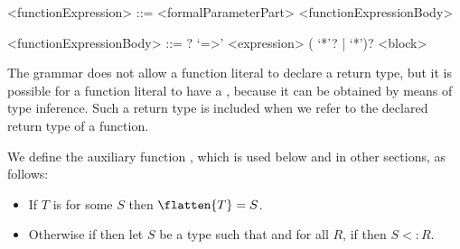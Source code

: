 \documentclass[makeidx]{article}
\begin{document}
{%
\begin{grammar}
<functionExpression> ::= <formalParameterPart> <functionExpressionBody>

<functionExpressionBody> ::= \ASYNC? `=>' <expression>
  \alt (\ASYNC{} `*'? | \SYNC{} `*')? <block>
\end{grammar}

\LMHash{}%
The grammar does not allow a function literal to declare a return type,
but it is possible for a function literal to have a
,
because it can be obtained by means of type inference.
Such a return type is included
when we refer to the declared return type of a function.


\LMHash{}%
We define the auxiliary function
,
which is used below and in other sections, as follows:

\begin{itemize}
\item If $T$ is  for some $S$ then $\flatten{T} = S$.

\item Otherwise if
then let $S$ be a type such that
and for all $R$, if
then $S <: R$.



\end{itemize}}
\end{document}
